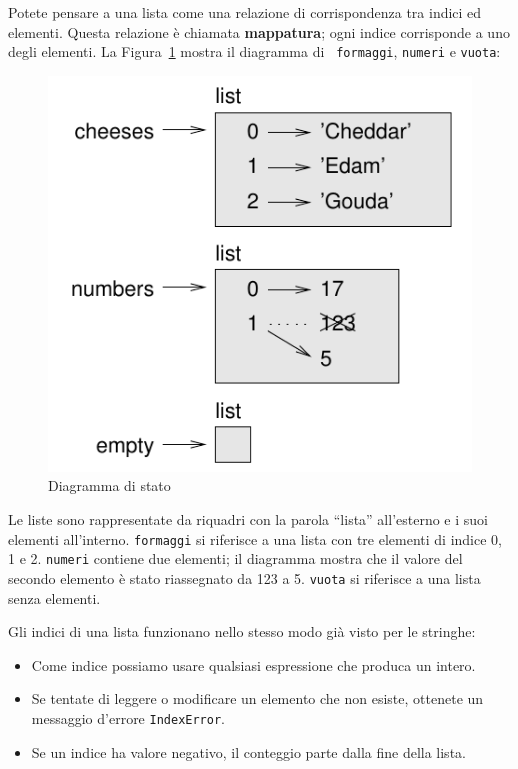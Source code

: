 \documentclass[10pt]{book}
\begin{document}
Potete pensare a una lista come una relazione di corrispondenza tra indici ed elementi. Questa relazione è chiamata {\bf mappatura}; ogni indice corrisponde a uno degli elementi. La Figura~\ref{fig.liststate} mostra il diagramma di {\tt
formaggi}, {\tt numeri} e {\tt vuota}:

\begin{figure}
\centerline
{\includegraphics[scale=0.8]{figs/liststate.pdf}}
\caption{Diagramma di stato}
\label{fig.liststate}
\end{figure}

Le liste sono rappresentate da riquadri con la parola ``lista'' all'esterno e i suoi elementi all'interno.  {\tt formaggi} si riferisce a una lista con tre elementi di indice 0, 1 e 2.
{\tt numeri} contiene due elementi; il diagramma mostra che il valore del secondo elemento è stato riassegnato da 123 a 5. {\tt vuota} si riferisce a una lista senza elementi.

Gli indici di una lista funzionano nello stesso modo già visto per le stringhe:

\begin{itemize}

\item Come indice possiamo usare qualsiasi espressione che produca un intero.

\item Se tentate di leggere o modificare un elemento che non esiste, ottenete
   un messaggio d'errore {\tt IndexError}.

\item Se un indice ha valore negativo, il conteggio parte dalla fine della
   lista.

\end{itemize}
\end{document}
